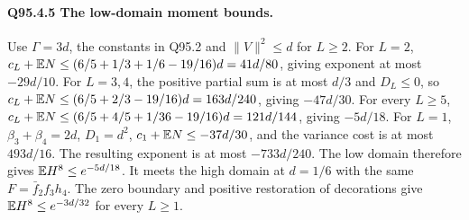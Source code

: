 \paragraph{Q95.4.5 The low-domain moment bounds.}
Use \(\Gamma=\allowbreak 3d\), the constants in Q95.2 and \(\|V\|^2\le\allowbreak  d\)
for \(L\ge\allowbreak 2\). For \(L=\allowbreak 2\),
\(c_L+\mathbb E N\le\allowbreak (6/5+1/3+1/6-19/16)d=\allowbreak 41d/80\), giving exponent
at most \(-29d/10\). For \(L=\allowbreak 3,\allowbreak 4\), the positive partial sum is
at most \(d/3\) and \(D_L\le\allowbreak 0\), so
\(c_L+\mathbb E N\le\allowbreak (6/5+2/3-19/16)d=\allowbreak 163d/240\), giving \(-47d/30\).
For every \(L\ge\allowbreak 5\),
\(c_L+\mathbb E N\le\allowbreak (6/5+4/5+1/36-19/16)d=\allowbreak 121d/144\), giving \(-5d/18\).
For \(L=\allowbreak 1\), \(\beta_3+\beta_4=\allowbreak 2d\), \(D_1=\allowbreak d^2\),
\(c_1+\mathbb E N\le\allowbreak -37d/30\), and the variance cost is at most \(493d/16\).
The resulting exponent is at most \(-733d/240\).
The low domain therefore gives \(\mathbb E H^8\le\allowbreak  e^{-5d/18}\).
It meets the high domain at \(d=\allowbreak 1/6\) with the same
\(F=\allowbreak \bar f_2f_3h_4\). The zero boundary and positive restoration
of decorations give \(\mathbb E H^8\le\allowbreak  e^{-3d/32}\) for every \(L\ge\allowbreak 1\).

